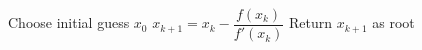 \begin{algorithm}[H]
\caption{Newton-Raphson Method}
\begin{algorithmic}[1]
\STATE Choose initial guess $x_0$
\REPEAT
    \STATE $x_{k+1} = x_k - \dfrac{f(x_k)}{f'(x_k)}$
\STATE Return $x_{k+1}$ as root
\end{algorithmic}
\end{algorithm}
